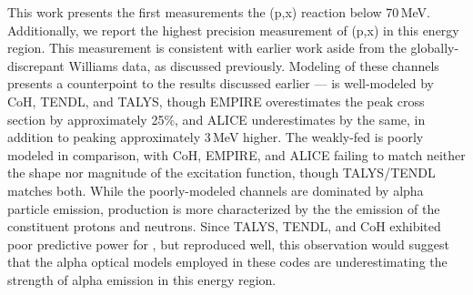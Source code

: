 This work presents the first measurements the (p,x) reaction below 70\,MeV.
Additionally, we report the highest precision measurement of (p,x) in this energy region.
This measurement is consistent with earlier work aside from the globally-discrepant Williams data, as discussed previously.
Modeling of these channels presents a counterpoint to the  results discussed earlier ---  is   well-modeled by CoH, TENDL, and TALYS, though EMPIRE overestimates the peak cross section by approximately 25\%, and ALICE underestimates by the same, in addition to peaking approximately 3\,MeV higher.
The weakly-fed  is poorly modeled in comparison, with CoH, EMPIRE, and ALICE failing to match neither the shape nor magnitude of the excitation function, though TALYS/TENDL matches both.
While the poorly-modeled  channels are dominated by alpha particle emission,   production is more characterized by the the emission of the constituent protons and neutrons.
Since TALYS, TENDL, and CoH exhibited poor predictive power for , but reproduced  well, this observation would suggest that the alpha optical models employed in these codes are underestimating the strength of alpha emission in this energy region. 


